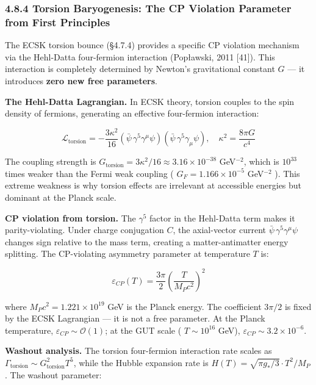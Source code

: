 \documentclass[11pt,a4paper]{article}
\theoremstyle{definition}\newtheorem{definition}{Definition}
\theoremstyle{remark}\newtheorem{remark}{Remark}
\begin{document}
\subsubsection{4.8.4 Torsion Baryogenesis: The CP Violation Parameter from First Principles}

The ECSK torsion bounce (§4.7.4) provides a specific CP violation mechanism via the Hehl-Datta four-fermion interaction (Popławski, 2011 [41]). This interaction is completely determined by Newton's gravitational constant $G$ — it introduces \textbf{zero new free parameters}.

\textbf{The Hehl-Datta Lagrangian.} In ECSK theory, torsion couples to the spin density of fermions, generating an effective four-fermion interaction:


\begin{equation}
\mathcal{L}_{\text{torsion}} = -\frac{3\kappa^2}{16} (\bar{\psi} \, \gamma^5\gamma^\mu\psi)(\bar{\psi} \, \gamma^5\gamma_\mu\psi), \quad \kappa^2 = \frac{8\pi G}{c^4}
\end{equation}


The coupling strength is $G_{\text{torsion}} = 3\kappa^2/16 \approx 3.16 \times 10^{-38}$ GeV$^{-2}$, which is $10^{33}$ times weaker than the Fermi weak coupling ( $G_F = 1.166 \times 10^{-5}$ GeV$^{-2}$ ). This extreme weakness is why torsion effects are irrelevant at accessible energies but dominant at the Planck scale.

\textbf{CP violation from torsion.} The $\gamma^5$ factor in the Hehl-Datta term makes it parity-violating. Under charge conjugation $C$, the axial-vector current $\bar{\psi} \, \gamma^5\gamma^\mu\psi$ changes sign relative to the mass term, creating a matter-antimatter energy splitting. The CP-violating asymmetry parameter at temperature $T$ is:


\begin{equation}
\boxed{\varepsilon_{CP}(T) = \frac{3\pi}{2}\left(\frac{T}{M_P c^2}\right)^2}
\end{equation}


where $M_P c^2 = 1.221 \times 10^{19}$ GeV is the Planck energy. The coefficient $3\pi/2$ is fixed by the ECSK Lagrangian — it is not a free parameter. At the Planck temperature, $\varepsilon_{CP} \sim \mathcal{O}(1)$; at the GUT scale ( $T \sim 10^{16}$ GeV), $\varepsilon_{CP} \sim 3.2 \times 10^{-6}$.

\textbf{Washout analysis.} The torsion four-fermion interaction rate scales as $\Gamma_{\text{torsion}} \sim G_{\text{torsion}}^2 T^5$, while the Hubble expansion rate is $H(T) = \sqrt{\pi g_*/3} \cdot T^2/M_P$. The washout parameter:
\end{document}
